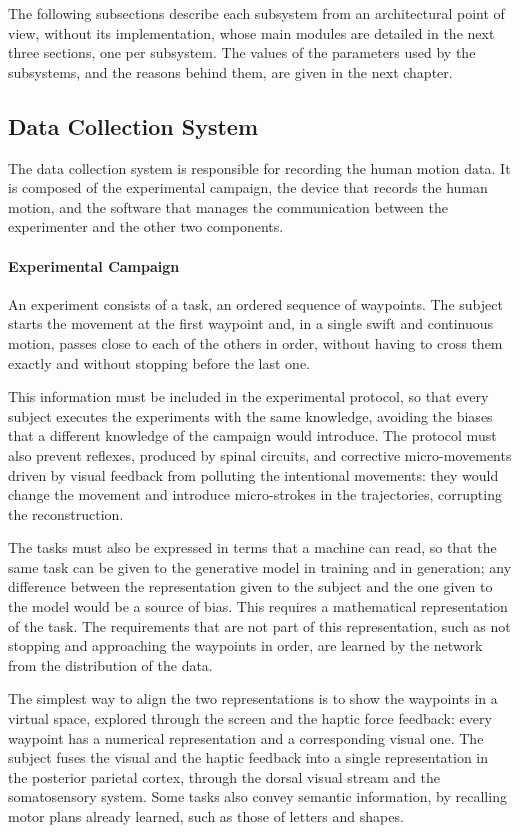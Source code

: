 \documentclass[12pt]{report}
\begin{document}
The following subsections describe each subsystem from an architectural point of view, without its implementation, whose main modules are detailed in the next three sections, one per subsystem. The values of the parameters used by the subsystems, and the reasons behind them, are given in the next chapter.

\subsection{Data Collection System}
The data collection system is responsible for recording the human motion data. It is composed of the experimental campaign, the device that records the human motion, and the software that manages the communication between the experimenter and the other two components.

\paragraph{Experimental Campaign}
An experiment consists of a task, an ordered sequence of waypoints. The subject starts the movement at the first waypoint and, in a single swift and continuous motion, passes close to each of the others in order, without having to cross them exactly and without stopping before the last one.

This information must be included in the experimental protocol, so that every subject executes the experiments with the same knowledge, avoiding the biases that a different knowledge of the campaign would introduce. The protocol must also prevent reflexes, produced by spinal circuits, and corrective micro-movements driven by visual feedback from polluting the intentional movements: they would change the movement and introduce micro-strokes in the trajectories, corrupting the reconstruction.

The tasks must also be expressed in terms that a machine can read, so that the same task can be given to the generative model in training and in generation; any difference between the representation given to the subject and the one given to the model would be a source of bias. This requires a mathematical representation of the task. The requirements that are not part of this representation, such as not stopping and approaching the waypoints in order, are learned by the network from the distribution of the data.

The simplest way to align the two representations is to show the waypoints in a virtual space, explored through the screen and the haptic force feedback: every waypoint has a numerical representation and a corresponding visual one. The subject fuses the visual and the haptic feedback into a single representation in the posterior parietal cortex, through the dorsal visual stream and the somatosensory system. Some tasks also convey semantic information, by recalling motor plans already learned, such as those of letters and shapes.
\end{document}
